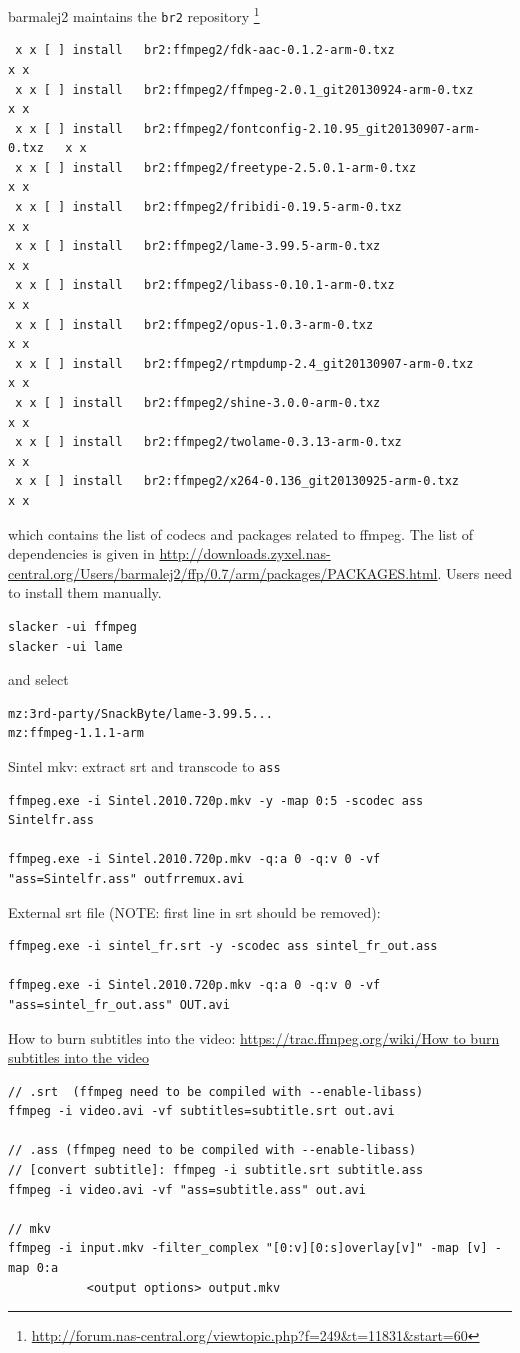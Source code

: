 barmalej2 maintains the \verb!br2! repository
\footnote{\url{http://forum.nas-central.org/viewtopic.php?f=249&t=11831&start=60}}
\begin{verbatim}
 x x [ ] install   br2:ffmpeg2/fdk-aac-0.1.2-arm-0.txz                    x x
 x x [ ] install   br2:ffmpeg2/ffmpeg-2.0.1_git20130924-arm-0.txz         x x
 x x [ ] install   br2:ffmpeg2/fontconfig-2.10.95_git20130907-arm-0.txz   x x
 x x [ ] install   br2:ffmpeg2/freetype-2.5.0.1-arm-0.txz                 x x
 x x [ ] install   br2:ffmpeg2/fribidi-0.19.5-arm-0.txz                   x x
 x x [ ] install   br2:ffmpeg2/lame-3.99.5-arm-0.txz                      x x
 x x [ ] install   br2:ffmpeg2/libass-0.10.1-arm-0.txz                    x x
 x x [ ] install   br2:ffmpeg2/opus-1.0.3-arm-0.txz                       x x
 x x [ ] install   br2:ffmpeg2/rtmpdump-2.4_git20130907-arm-0.txz         x x
 x x [ ] install   br2:ffmpeg2/shine-3.0.0-arm-0.txz                      x x
 x x [ ] install   br2:ffmpeg2/twolame-0.3.13-arm-0.txz                   x x
 x x [ ] install   br2:ffmpeg2/x264-0.136_git20130925-arm-0.txz           x x
\end{verbatim}
which contains the list of codecs and packages related to ffmpeg. The list of
dependencies is given in
\url{http://downloads.zyxel.nas-central.org/Users/barmalej2/ffp/0.7/arm/packages/PACKAGES.html}.
Users need to install them manually.
\begin{verbatim}
slacker -ui ffmpeg
slacker -ui lame
\end{verbatim}
and select 
\begin{verbatim}
mz:3rd-party/SnackByte/lame-3.99.5...
mz:ffmpeg-1.1.1-arm
\end{verbatim}


Sintel mkv: extract srt and transcode to \verb!ass!
\begin{verbatim}
ffmpeg.exe -i Sintel.2010.720p.mkv -y -map 0:5 -scodec ass Sintelfr.ass

ffmpeg.exe -i Sintel.2010.720p.mkv -q:a 0 -q:v 0 -vf "ass=Sintelfr.ass" outfrremux.avi
\end{verbatim}

External srt file (NOTE: first line in srt should be removed):
\begin{verbatim}
ffmpeg.exe -i sintel_fr.srt -y -scodec ass sintel_fr_out.ass

ffmpeg.exe -i Sintel.2010.720p.mkv -q:a 0 -q:v 0 -vf "ass=sintel_fr_out.ass" OUT.avi
\end{verbatim}


How to burn subtitles into the video: \url{https://trac.ffmpeg.org/wiki/How to
burn subtitles into the video}
\begin{verbatim}
// .srt  (ffmpeg need to be compiled with --enable-libass)
ffmpeg -i video.avi -vf subtitles=subtitle.srt out.avi

// .ass (ffmpeg need to be compiled with --enable-libass)
// [convert subtitle]: ffmpeg -i subtitle.srt subtitle.ass
ffmpeg -i video.avi -vf "ass=subtitle.ass" out.avi

// mkv
ffmpeg -i input.mkv -filter_complex "[0:v][0:s]overlay[v]" -map [v] -map 0:a
           <output options> output.mkv
\end{verbatim}

